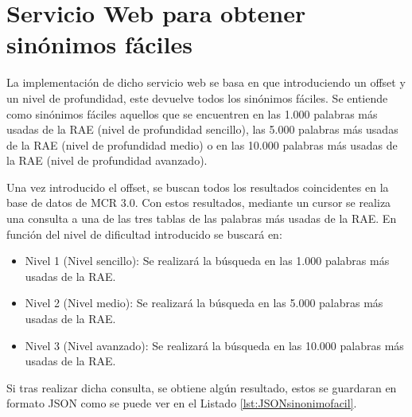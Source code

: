 \section{Servicio Web  para obtener sinónimos fáciles}

La implementación de dicho servicio web se basa en que introduciendo un offset y un nivel de profundidad, este devuelve todos los sinónimos fáciles. Se entiende como sinónimos fáciles aquellos que se encuentren en las 1.000 palabras más usadas de la RAE (nivel de profundidad sencillo), las 5.000 palabras más usadas de la RAE (nivel de profundidad medio) o en las 10.000 palabras más usadas de la RAE (nivel de profundidad avanzado).

Una vez introducido el offset, se buscan todos los resultados coincidentes en la base de datos de MCR 3.0. Con estos resultados, mediante un cursor se realiza una consulta a una de las tres tablas de las palabras más usadas de la RAE. En función del nivel de dificultad introducido se buscará en:
\begin{itemize}
	\item Nivel 1 (Nivel sencillo): Se realizará la búsqueda en las 1.000 palabras más usadas de la RAE.
	\item Nivel 2 (Nivel medio): Se realizará la búsqueda en las 5.000 palabras más usadas de la RAE.
	\item Nivel 3 (Nivel avanzado): Se realizará la búsqueda en las 10.000 palabras más usadas de la RAE.
\end{itemize}

Si tras realizar dicha consulta, se obtiene algún resultado, estos se guardaran en formato JSON como se puede ver en el Listado  \ref{lst:JSONsinonimofacil}.





